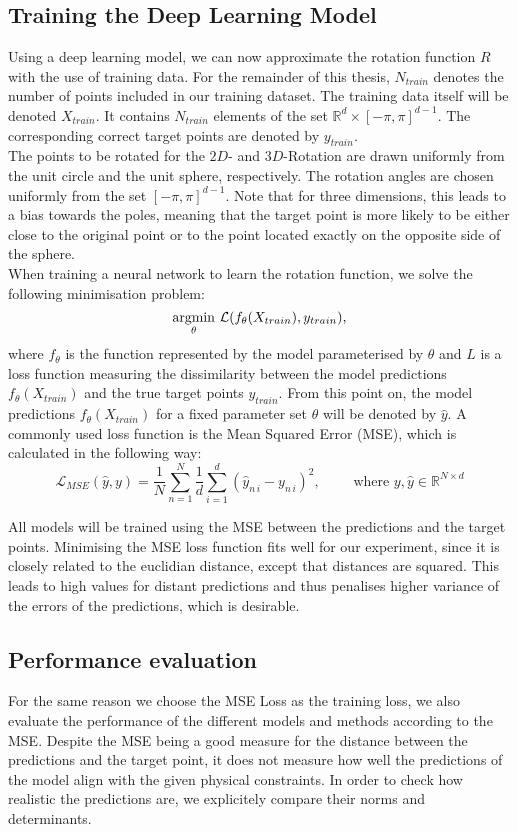 \subsection{Training the Deep Learning Model}
\indent Using a deep learning model, we can now approximate the rotation function $R$ with the use of training data. For the remainder of this thesis, $N_{train}$ denotes the number of points included in our training dataset. The training data itself will be denoted $X_{train}$. It contains $N_{train}$ elements of the set $\mathbb{R}^{d} \times [- \pi, \pi] ^{d-1}$. The corresponding correct target points are denoted by $y_{train}$.\\
\indent The points to be rotated for the $2D$- and $3D$-Rotation are drawn uniformly from the unit circle and the unit sphere, respectively. The rotation angles are chosen uniformly from the set $[-\pi, \pi]^{d-1}$. Note that for three dimensions, this leads to a bias towards the poles, meaning that the target point is more likely to be either close to the original point or to the point located exactly on the opposite side of the sphere.\\
\indent When training a neural network to learn the rotation function, we solve the following minimisation problem:
\[\underset{\theta}{\operatorname*{argmin}} \,\, \mathcal{L}(f_{\theta} (X_{train}), y_{train}), \]
where $f_\theta$ is the function represented by the model parameterised by $\theta$ and $L$ is a loss function measuring the dissimilarity between the model predictions $f_{\theta} (X_{train})$ and the true target points $y_{train}$. From this point on, the model predictions $f_{\theta} (X_{train})$ for a fixed parameter set $\theta$ will be denoted by $\hat{y}$.
A commonly used loss function is the Mean Squared Error (MSE), which is calculated in the following way:
\[\mathcal{L}_{MSE}(\hat{y}, y) = \frac{1}{N}\sum_{n = 1}^{N} \frac{1}{d} \sum_{i = 1}^{d} (\hat{y}_{n\,i} - y_{n\,i})^2, \qquad \text{ where } y, \hat{y} \in \mathbb{R}^{N \times d}\]

\indent All models will be trained using the MSE between the predictions and the target points. Minimising the MSE loss function fits well for our experiment, since it is closely related to the euclidian distance, except that distances are squared. This leads to high values for distant predictions and thus penalises higher variance of the errors of the predictions, which is desirable.\\ 

\subsection{Performance evaluation}
For the same reason we choose the MSE Loss as the training loss, we also evaluate the performance of the different models and methods according to the MSE. Despite the MSE being a good measure for the distance between the predictions and the target point, it does not measure how well the predictions of the model align with the given physical constraints. In order to check how realistic the predictions are, we explicitely compare their norms and determinants.\\

